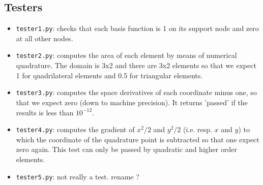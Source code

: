 \begin{multicols}{2}


\begin{tiny}

\end{tiny}
\end{multicols}

\begin{multicols}{2}


\begin{tiny}

\end{tiny}
\end{multicols}

\begin{multicols}{2}


\begin{tiny}

\end{tiny}
\end{multicols}




\newpage
\subsection*{Testers}

\begin{itemize}
\item \lstinline{tester1.py}: checks that each basis function is 1 on its support node and zero at all other nodes.
\item \lstinline{tester2.py}: computes the area of each element by means of numerical quadrature. The domain is 3x2 and there are 3x2 elements so that we expect 1 for quadrilateral elements and 0.5 for triangular elements.  
\item \lstinline{tester3.py}: computes the space derivatives of each coordinate minus one, so that we expect zero (down to machine precision). It returns 'passed' if the results is less than $10^{-12}$.   
\item \lstinline{tester4.py}: computes the gradient of $x^2/2$ and $y^2/2$ (i.e. resp. $x$ and $y$) to which the coordinate of the quadrature point is subtracted so that one expect zero again. This test can only be passed by quadratic and higher order elements.
\item \lstinline{tester5.py}: not really a test. rename ?
\end{itemize}


